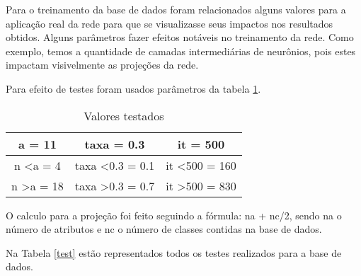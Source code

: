 \documentclass[
	article,			%
	11pt,				%
	oneside,			%
	a4paper,			%
	english,			%
	brazil,				%
	sumario=tradicional
	]{abntex2}
\begin{document}
Para o treinamento da base de dados foram relacionados alguns valores para a aplicação real da rede para que se visualizasse seus impactos nos resultados obtidos. Alguns parâmetros fazer efeitos notáveis no treinamento da rede. Como exemplo, temos a quantidade de camadas intermediárias de neurônios, pois estes impactam visivelmente as projeções da rede. 

Para efeito de testes foram usados parâmetros da tabela \ref{val}.

\begin{table}[h]
	\centering
	\caption{Valores testados}
	\label{val}
	\begin{tabular}{|c|c|c|}
		\hline
		a = 11                & taxa = 0.3                  & it = 500                  \\ \hline
		n \textless a = 4     & taxa \textless 0.3 = 0.1    & it \textless 500 = 160    \\ \hline
		n \textgreater a = 18 & taxa \textgreater 0.3 = 0.7 & it \textgreater 500 = 830 \\ \hline
	\end{tabular}
\end{table}

O calculo para a projeção foi feito seguindo a fórmula: na + nc/2, sendo na o número de atributos e nc o número de classes contidas na base de dados.

Na Tabela \ref{test} estão representados todos os testes realizados para a base de dados.
\end{document}
